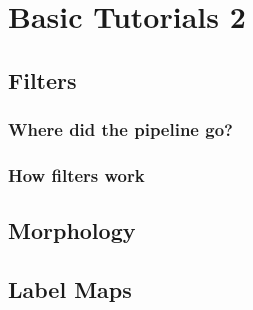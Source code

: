 \section{Basic Tutorials 2}

\subsection{Filters}

\begin{frame}
\frametitle{Where did the pipeline go?}

\end{frame}

\begin{frame}
\frametitle{How filters work}
\end{frame}

\subsection{Morphology}

\subsection{Label Maps}





